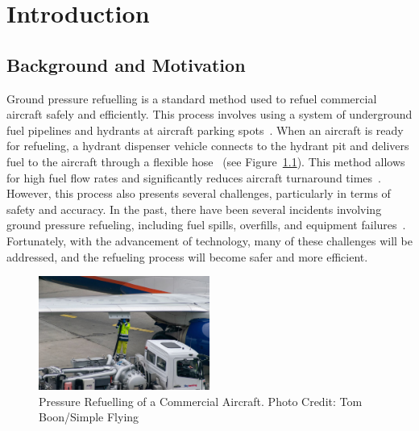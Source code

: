 \documentclass[12pt,oneside]{book} %
\begin{document}
%
%
\mainmatter\pagestyle{fancy}
\fancyhead[L]{\nouppercase{\leftmark}}
\fancyhead[R]{\nouppercase{\rightmark}}

\chapter{Introduction}
\section{Background and Motivation}

Ground pressure refuelling is a standard method used to refuel commercial
aircraft safely and efficiently. This process involves using a system of
underground fuel pipelines and hydrants at aircraft parking
spots~\cite{blakey2011aviation}. When an aircraft is ready for refueling, a
hydrant dispenser vehicle connects to the hydrant pit and delivers fuel to the
aircraft through a flexible hose~\cite{sati2019aircraft} (see
Figure~\ref{fig:pressure-refuelling}). This method allows for high fuel flow
rates and significantly reduces aircraft turnaround
times~\cite{blakey2011aviation}. However, this process also presents several
challenges, particularly in terms of safety and accuracy. In the past, there
have been several incidents involving ground pressure refueling, including fuel
spills, overfills, and equipment
failures~\cite{doi:10.1080/13669877.2013.879493, CostsOfUnsafetyAviation}.
Fortunately, with the advancement of technology, many of these challenges will
be addressed, and the refueling process will become safer and more efficient. 

\begin{figure}[H]
    \centering
    \includegraphics[width=0.5\textwidth]{figures/pressure-refuelling.jpeg}
    \caption{Pressure Refuelling of a Commercial Aircraft. Photo Credit: Tom Boon/Simple Flying~\cite{ImageRefueling}}\label{fig:pressure-refuelling}
\end{figure}
\end{document}
